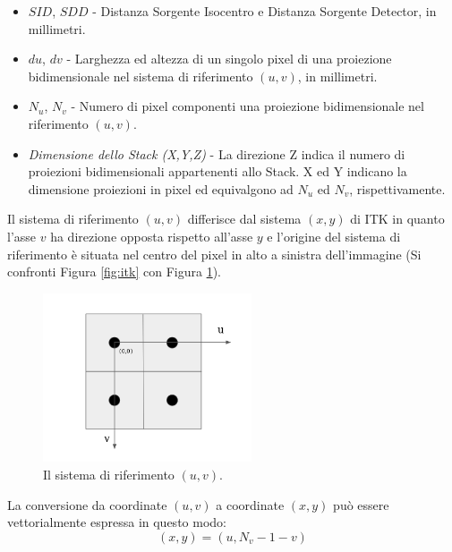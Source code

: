 \documentclass[a4paper,12pt, doubleside]{report}
\begin{document}
                \begin{itemize}
                    \item $SID$, $SDD$ - Distanza Sorgente Isocentro e Distanza Sorgente Detector, in millimetri.
                    
                    \item $du$, $dv$ - Larghezza ed altezza di un singolo pixel di una proiezione bidimensionale nel sistema di riferimento $(u,v)$, in millimetri.
                    
                    \item $N_u$, $N_v$ - Numero di pixel componenti una proiezione bidimensionale nel riferimento $(u,v)$.
                    
                    \item \textit{Dimensione dello Stack (X,Y,Z)} - La direzione Z indica il numero di proiezioni bidimensionali appartenenti allo Stack. X ed Y indicano la dimensione proiezioni in pixel ed equivalgono ad $N_u$ ed $N_v$, rispettivamente.
                \end{itemize}
                    
                Il sistema di riferimento $(u,v)$ differisce dal sistema $(x,y)$ di ITK in quanto l'asse $v$ ha direzione opposta rispetto all'asse $y$ e l'origine del sistema di riferimento è situata nel centro del pixel in alto a sinistra dell'immagine (Si confronti Figura \ref{fig:itk} con Figura \ref{fig:uv}).
                    
                \begin{figure}[h]
                    \centering
                    \includegraphics[width=0.55\textwidth]{uv}
                    \caption{Il sistema di riferimento $(u,v)$.}
                    \label{fig:uv}
                \end{figure}
                
                La conversione da coordinate $(u,v)$ a coordinate $(x,y)$ può essere vettorialmente espressa in questo modo:
                \begin{equation} \label{eq:uv-conversion}
                    (x,y) = ( u, N_v - 1 - v )
                \end{equation}
                    
\end{document}
